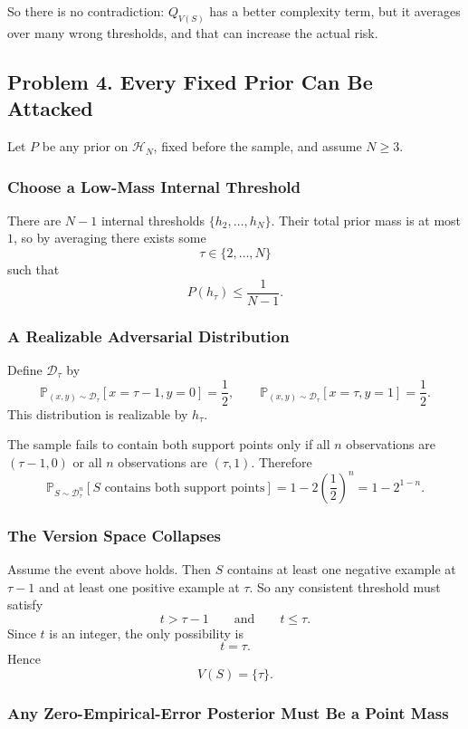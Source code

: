 \documentclass{article}
\newcommand{\PP}{\mathbb{P}}
\newcommand{\cH}{\mathcal{H}}
\newcommand{\cD}{\mathcal{D}}
\begin{document}
So there is no contradiction: $Q_{V(S)}$ has a better complexity term, but it averages over many wrong thresholds, and that can increase the actual risk.

\subsection{Problem 4. Every Fixed Prior Can Be Attacked}

Let $P$ be any prior on $\cH_N$, fixed before the sample, and assume $N\ge 3$.

\subsubsection{Choose a Low-Mass Internal Threshold}

There are $N-1$ internal thresholds $\{h_2,\dots,h_N\}$. Their total prior mass is at most $1$, so by averaging there exists some
$$
\tau\in\{2,\dots,N\}
$$
such that
$$
P(h_\tau)\le \frac{1}{N-1}.
$$

\subsubsection{A Realizable Adversarial Distribution}

Define $\cD_\tau$ by
$$
\PP_{(x,y)\sim\cD_\tau}[x=\tau-1,y=0]=\frac12,
\qquad
\PP_{(x,y)\sim\cD_\tau}[x=\tau,y=1]=\frac12.
$$
This distribution is realizable by $h_\tau$.

The sample fails to contain both support points only if all $n$ observations are $(\tau-1,0)$ or all $n$ observations are $(\tau,1)$. Therefore
$$
\PP_{S\sim \cD_\tau^n}[\text{$S$ contains both support points}]
=
1-2\left(\frac12\right)^n
=
1-2^{1-n}.
$$

\subsubsection{The Version Space Collapses}

Assume the event above holds. Then $S$ contains at least one negative example at $\tau-1$ and at least one positive example at $\tau$. So any consistent threshold must satisfy
$$
t>\tau-1
\qquad
\text{and}
\qquad
t\le \tau.
$$
Since $t$ is an integer, the only possibility is
$$
t=\tau.
$$
Hence
$$
V(S)=\{\tau\}.
$$

\subsubsection{Any Zero-Empirical-Error Posterior Must Be a Point Mass}
\end{document}
